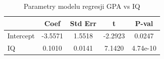 \begin{table}[H]
\caption{Parametry modelu regresji GPA vs IQ}
\label{tab:zad2_params}
\begin{tabular}{lcccc}
\toprule
 & Coef & Std Err & t & P-val \\
\midrule
Intercept & -3.5571 & 1.5518 & -2.2923 & 0.0247 \\
IQ & 0.1010 & 0.0141 & 7.1420 & 4.74e-10 \\
\bottomrule
\end{tabular}
\end{table}
